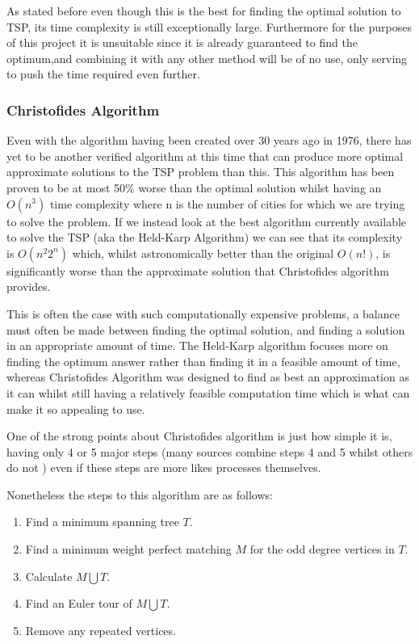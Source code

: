 \documentclass[11pt,a4paper,titlepage]{article}
\begin{document}
As stated before even though this is the best for finding the optimal solution to TSP, its time complexity is still exceptionally large. Furthermore for the purposes of this project it is unsuitable since it is already guaranteed to find the optimum,and combining it with any other method will be of no use, only serving to push the time required even further. 

\subsubsection{Christofides Algorithm}
Even with the algorithm having been created over 30 years ago in 1976, there has yet to be another verified algorithm at this time that can produce more optimal approximate solutions to the TSP problem than this. This algorithm has been proven to be at most 50\% worse than the optimal solution whilst having an $O(n^3)$ time complexity where n is the number of cities for which we are trying to solve the problem. \cite{ChrAlg} If we instead look at the best algorithm currently available to solve the TSP (aka the Held-Karp Algorithm) we can see that its complexity is $O(n^2 2^n)$ \cite{HeldKarpAlg} which, whilst astronomically better than the original $O(n!)$, is significantly worse than the approximate solution that Christofides algorithm provides.

This is often the case with such computationally expensive problems, a balance must often be made between finding the optimal solution, and finding a solution in an appropriate amount of time. The Held-Karp algorithm focuses more on finding the optimum answer rather than finding it in a feasible amount of time, whereas Christofides Algorithm was designed to find as best an approximation as it can whilst still having a relatively feasible computation time which is what can make it so appealing to use. 

One of the strong points about Christofides algorithm is just how simple it is, having only 4 or 5 major steps (many sources combine steps 4 and 5 whilst others do not \cite{ChrAlgSlides, ChrAlgSteps}) even if these steps are more likes processes themselves. 

Nonetheless the steps to this algorithm are as follows:
\begin{enumerate}
	\item Find a minimum spanning tree $T$.
	\item Find a minimum weight perfect matching $M$ for the odd degree vertices in $T$.
	\item Calculate $M \bigcup T$.
	\item Find an Euler tour of $M \bigcup T$.
	\item Remove any repeated vertices.
\end{enumerate}
\end{document}
